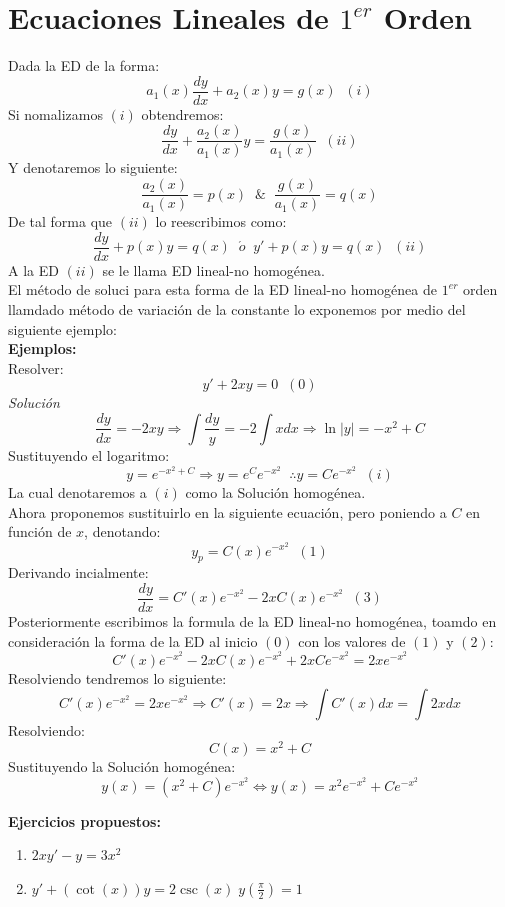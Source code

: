 \documentclass[10pt]{article}
\begin{document}
\section{Ecuaciones Lineales de $1^{er}$ Orden}
Dada la ED de la forma:
\[a_{1}\left(x\right)\frac{dy}{dx}+a_{2}\left(x\right)y=g\left(x\right)\;\;(i)\]
Si nomalizamos $(i)$ obtendremos:
\[\frac{dy}{dx}+\frac{a_{2}\left(x\right)}{a_{1}\left(x\right)}y=\frac{g\left(x\right)}{a_{1}\left(x\right)}\;\;(ii)\]
Y denotaremos lo siguiente:
\[\frac{a_{2}(x)}{a_{1}(x)}=p(x)\;\;\&\;\;\frac{g(x)}{a_{1}(x)}=q(x)\]
De tal forma que $(ii)$ lo reescribimos como:
\[\frac{dy}{dx}+p(x)y=q(x)\;\;\acute{o}\;\;y'+p(x)y=q(x)\;\;(ii)\]
A la ED $(ii)$ se le llama ED lineal-no homogénea.\\
El método de soluci para esta forma de la ED lineal-no homogénea de $1^{er}$ orden llamdado método de variación de la constante lo exponemos por medio del siguiente ejemplo:
\\
\textbf{Ejemplos:}
\\
Resolver:
\[y'+2xy=0\;\;(0)\]
\textit{Solución}\\
\[\frac{dy}{dx}=-2xy \Rightarrow \int\frac{dy}{y}=-2\int xdx \Rightarrow \ln\left|y\right|=-x^{2}+C\]
Sustituyendo el logaritmo:
\[y=e^{-x^{2}+C}\Rightarrow y=e^{C}e^{-x^{2}}\;\;\therefore y=Ce^{-x^{2}}\;\;(i)\]
La cual denotaremos a $(i)$ como la Solución homogénea.\\
Ahora proponemos sustituirlo en la siguiente ecuación, pero poniendo a $C$ en función de $x$, denotando:
\[y_{p}=C(x)e^{-x^{2}}\;\;(1)\]
Derivando incialmente:
\[\frac{dy}{dx}=C'(x)e^{-x^{2}}-2xC(x)e^{-x^{2}}\;\;(3)\]
Posteriormente escribimos la formula de la ED lineal-no homogénea, toamdo en consideración la forma de la ED al inicio $(0)$ con los valores de $(1)$ y $(2)$:
\[C'(x)e^{-x^{2}}-2xC(x)e^{-x^{2}}+2xCe^{-x^2}=2xe^{-x^{2}}\]
Resolviendo tendremos lo siguiente:
\[C'(x)e^{-x^{2}}=2xe^{-x^{2}}\Rightarrow C'(x)=2x \Rightarrow \int C'(x)dx=\int 2xdx\]
Resolviendo:
\[C(x)=x^{2}+C\]
Sustituyendo la Solución homogénea:
\[y(x)=\left(x^{2}+C\right)e^{-x^{2}}\Leftrightarrow y(x)=x^{2}e^{-x^{2}}+Ce^{-x^{2}}\]

\textbf{Ejercicios propuestos:}
\begin{enumerate}
  \item \(\displaystyle 2xy' -y=3x^{2}\)
  \item \(\displaystyle y'+\left(\cot(x)\right)y=2\csc(x)\;y\left(\frac{\pi}{2}\right)=1\)
\end{enumerate}
\end{document}

